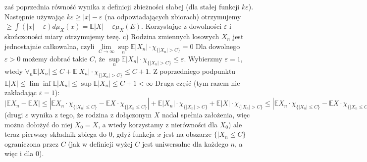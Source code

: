 \documentclass{article}
\begin{document}
zaś poprzednia równość wynika z definicji zbieżności słabej (dla stałej funkcji $k\varepsilon$). Następnie używając $k\varepsilon\ge|x|-\varepsilon$ (na odpowiadających zbiorach) otrzymujemy\newline
$\ge\int(|x|-\varepsilon)d\mu_X(x)=\mathbb{E}|X|-\varepsilon\mu_X(E)$. Korzystając z dowolności $\varepsilon$ i skończoności miary otrzymujemy tezę.\newline\newline
c) Rodzina zmiennych losowych $X_n$ jest jednostajnie całkowalna, czyli $\lim\limits_{C\rightarrow\infty}\sup\limits_{n}\mathbb{E}|X_n|\cdot\chi_{\{|X_n|>C\}}=0$\newline
Dla dowolnego $\varepsilon>0$ możemy dobrać takie $C$, że $\sup\limits_{n}\mathbb{E}|X_n|\cdot\chi_{\{|X_n|>C\}}\le\varepsilon$. Wybierzmy $\varepsilon=1$, wtedy\newline
$\forall_{n} \mathbb{E}|X_n|\le C+\mathbb{E}|X_n|\cdot\chi_{\{|X_n|>C\}}\le C+1$.\newline
Z poprzedniego podpunktu $\mathbb{E}|X|\le\lim\inf\mathbb{E}|X_n|\le\sup\mathbb{E}|X_n|\le C+1<\infty$\newline
Druga część (tym razem nie zakładając $\varepsilon=1$):
$|\mathbb{E}X_n-\mathbb{E}X|\le|\mathbb{E}X_n\cdot\chi_{\{|X_n|\le C\}}-\mathbb{E}X\cdot\chi_{\{|X_n\le C\}}|+\mathbb{E}|X_n|\cdot\chi_{\{|X_n|>C\}}+\mathbb{E}|X|\cdot\chi_{\{|X_n|>C\}}
\le|\mathbb{E}X_n\cdot\chi_{\{|X_n|\le C\}}-\mathbb{E}X\cdot\chi_{\{|X_n\le C\}}|+\varepsilon+\varepsilon$
(drugi $\varepsilon$ wynika z tego, że rodzina z dołączonym $X$ nadal spełnia założenia, więc można dołożyć do niej $X_0=X$, a wtedy korzystamy z nierówności dla $X_0$)
ale teraz pierwszy składnik zbiega do $0$, gdyż funkcja $x$ jest na obszarze ${\{|X_n\le C\}}$ ograniczona przez $C$ (jak w definicji wyżej $C$ jest uniwersalne dla każdego $n$, a więc i dla $0$).
\end{document}
